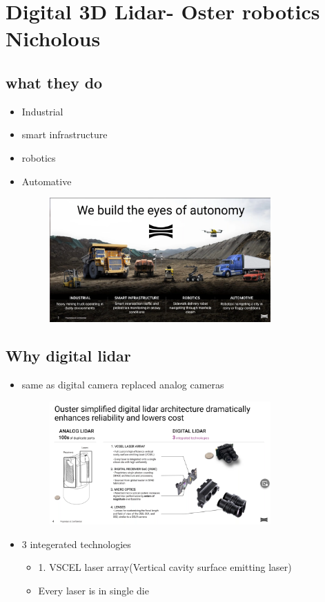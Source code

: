 \documentclass[a4paper]{article}
\begin{document}
\section{Digital 3D Lidar- Oster robotics Nicholous}
\subsection{what they do}
\begin{itemize}
	\item Industrial
	\item smart infrastructure
	\item robotics
	\item Automative
	      \begin{figure}[htpb]
		      \centering
		      \includegraphics[width=0.8\textwidth]{whatOusterdo.png}
		      \caption{}
		      \label{fig:}
	      \end{figure}
\end{itemize}
\subsection{Why digital lidar}
\begin{itemize}
	\item  same as digital camera replaced analog cameras
	      \begin{figure}[H]
		      \centering
		      \includegraphics[width=0.8\textwidth]{whydigital.png}
		      \caption{}
		      \label{fig:}
	      \end{figure}
	\item 3 integerated technologies
	      \begin{itemize}
		      \item 1. VSCEL laser array(Vertical cavity surface emitting laser)
		      \item Every laser is in single die
	      \end{itemize}
\end{itemize}
\end{document}
